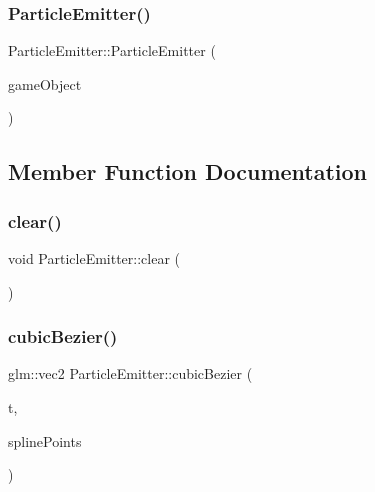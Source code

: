 \hypertarget{class_mason_1_1_particle_emitter_a6a985b19a4f37f242030afe2c8cc5545}{}\label{class_mason_1_1_particle_emitter_a6a985b19a4f37f242030afe2c8cc5545} 
\subsubsection{\texorpdfstring{Particle\+Emitter()}{ParticleEmitter()}}
{\footnotesize\ttfamily Particle\+Emitter\+::\+Particle\+Emitter (\begin{DoxyParamCaption}\item[{std\+::shared\+\_\+ptr$<$ \hyperlink{class_mason_1_1_game_object}{Game\+Object} $>$}]{game\+Object }\end{DoxyParamCaption})\hspace{0.3cm}{\ttfamily [protected]}}



\subsection{Member Function Documentation}
\hypertarget{class_mason_1_1_particle_emitter_a14b63dca4ee3812ffb68f8927956683d}{}\label{class_mason_1_1_particle_emitter_a14b63dca4ee3812ffb68f8927956683d} 
\subsubsection{\texorpdfstring{clear()}{clear()}}
{\footnotesize\ttfamily void Particle\+Emitter\+::clear (\begin{DoxyParamCaption}{ }\end{DoxyParamCaption})}

\hypertarget{class_mason_1_1_particle_emitter_a9750a2b4f2f644691822b266359f1c86}{}\label{class_mason_1_1_particle_emitter_a9750a2b4f2f644691822b266359f1c86} 
\subsubsection{\texorpdfstring{cubic\+Bezier()}{cubicBezier()}}
{\footnotesize\ttfamily glm\+::vec2 Particle\+Emitter\+::cubic\+Bezier (\begin{DoxyParamCaption}\item[{float}]{t,  }\item[{std\+::vector$<$ glm\+::vec2 $>$}]{spline\+Points }\end{DoxyParamCaption})\hspace{0.3cm}{\ttfamily [protected]}}

